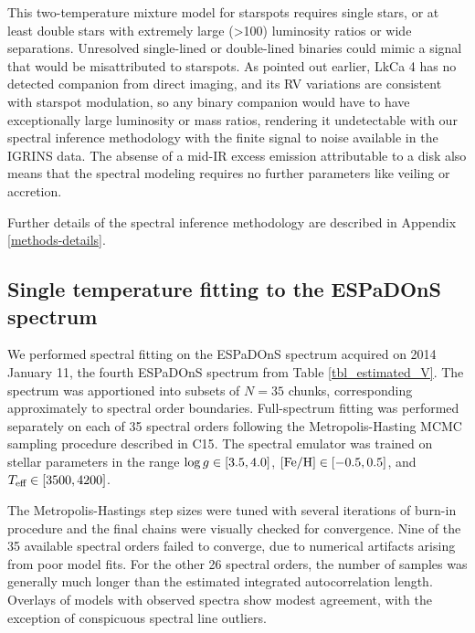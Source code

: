 \documentclass[twocolumn]{emulateapj}%
\newcommand{\iancze}{{\sc C15}}
\begin{document}
This two-temperature mixture model for starspots requires single stars, or at least double stars with extremely large (>100) luminosity ratios or wide separations.  Unresolved single-lined or double-lined binaries could mimic a signal that would be misattributed to starspots.  As pointed out earlier, LkCa 4 has no detected companion from direct imaging, and its RV variations are consistent with starspot modulation, so any binary companion would have to have exceptionally large luminosity or mass ratios, rendering it undetectable with our spectral inference methodology with the finite signal to noise available in the IGRINS data.  The absense of a mid-IR excess emission attributable to a disk also means that the spectral modeling requires no further parameters like veiling or accretion.

Further details of the spectral inference methodology are described in Appendix \ref{methods-details}.


\subsection{Single temperature fitting to the ESPaDOnS spectrum}\label{sec:ESP_starfish}

We performed spectral fitting on the ESPaDOnS spectrum acquired on 2014 January 11, the fourth ESPaDOnS spectrum from Table \ref{tbl_estimated_V}.  The spectrum was apportioned into subsets of $N=35$ chunks, corresponding approximately to spectral order boundaries.  Full-spectrum fitting was performed separately on each of 35 spectral orders following the Metropolis-Hasting MCMC sampling procedure described in \iancze.  The spectral emulator was trained on stellar parameters in the range $\log g \in [3.5, 4.0]$, $[{\rm Fe}/{\rm H}] \in [-0.5, 0.5]$, and $T_\textrm{eff} \in [3500, 4200]$.

The Metropolis-Hastings step sizes were tuned with several iterations of burn-in procedure and the final chains were visually checked for convergence.  Nine of the 35 available spectral orders failed to converge, due to numerical artifacts arising from poor model fits.  For the other 26 spectral orders, the number of samples was generally much longer than the estimated integrated autocorrelation length.  Overlays of models with observed spectra show modest agreement, with the exception of conspicuous spectral line outliers.
\end{document}
